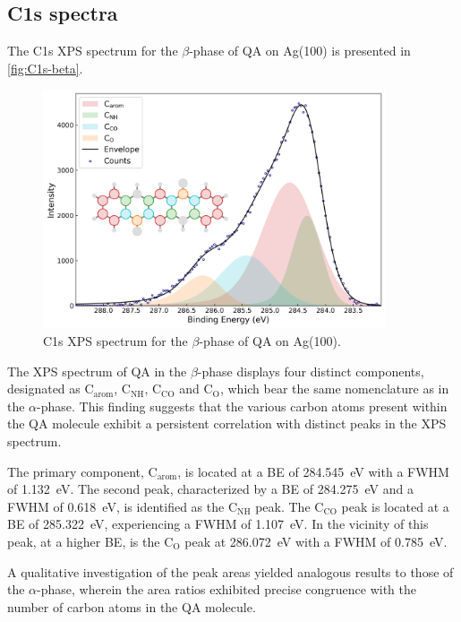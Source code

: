 \subsection{C1s spectra}

The C1s \ac{XPS} spectrum for the $\beta$-phase of \ac{QA} on Ag(100) is presented in \autoref{fig:C1s-beta}.

\begin{figure}[H]
	\centering
	\includegraphics[width=0.9\textwidth]{images/C1s-beta.png}
	\caption{C1s \ac{XPS} spectrum for the $\beta$-phase of \ac{QA} on Ag(100).}
	\label{fig:C1s-beta}
\end{figure}

The \ac{XPS} spectrum of \ac{QA} in the $\beta$-phase displays four distinct components, designated as $\mathrm{C_{arom}}$, $\mathrm{C_{NH}}$, $\mathrm{C_{CO}}$ and $\mathrm{C_{O}}$, which bear the same nomenclature as in the $\alpha$-phase. This finding suggests that the various carbon atoms present within the \ac{QA} molecule exhibit a persistent correlation with distinct peaks in the \ac{XPS} spectrum.

The primary component, $\mathrm{C_{arom}}$, is located at a \ac{BE} of 284.545~\si{\eV} with a \ac{FWHM} of 1.132~\si{\eV}. The second peak, characterized by a \ac{BE} of 284.275~\si{\eV} and a \ac{FWHM} of 0.618~\si{\eV}, is identified as the $\mathrm{C_{NH}}$ peak. The $\mathrm{C_{CO}}$ peak is located at a \ac{BE} of 285.322~\si{\eV}, experiencing a \ac{FWHM} of 1.107~\si{\eV}. In the vicinity of this peak, at a higher \ac{BE}, is the $\mathrm{C_{O}}$ peak at 286.072~\si{\eV} with a \ac{FWHM} of 0.785~\si{\eV}.

A qualitative investigation of the peak areas yielded analogous results to those of the $\alpha$-phase, wherein the area ratios exhibited precise congruence with the number of carbon atoms in the \ac{QA} molecule.

